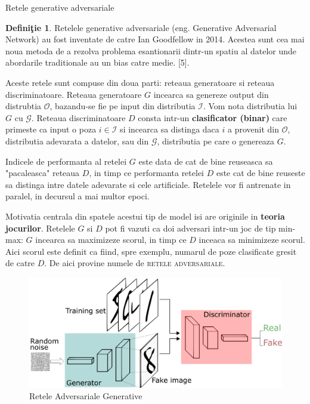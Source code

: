 \documentclass[12pt]{article}
\theoremstyle{definition}
\newtheorem{defi}[thr]{\bf Defini\c{t}ie}
\begin{document}
\begin{subsubsection}{Retele generative adversariale}
\begin{defi}
Retelele generative adversariale (eng. Generative Adversarial Network) au fost inventate de catre Ian Goodfellow in 2014.
Acestea sunt cea mai noua metoda de a rezolva problema esantionarii dintr-un spatiu al datelor unde abordarile traditionale au un bias catre medie. [5].

Aceste retele sunt compuse din doua parti: reteaua generatoare si reteaua discriminatoare.
Reteaua generatoare $G$ incearca sa genereze output din distrubtia $\mathcal{O}$, bazandu-se fie pe input din distributia $\mathcal{I}$. Vom nota distributia lui $G$ cu $\mathcal{G}$.
Reteaua discriminatoare $D$ consta intr-un \textbf{clasificator (binar)} care primeste ca input o poza $i \in \mathcal{I}$ si incearca sa distinga daca $i$ a provenit din $\mathcal{O}$, distributia adevarata a datelor, sau din $\mathcal{G}$, distributia pe care o genereaza $G$.

Indicele de performanta al retelei $G$ este data de cat de bine reuseasca sa "pacaleasca" reteaua $D$, in timp ce performanta retelei $D$ este cat de bine reuseste sa distinga intre datele adevarate si cele artificiale. Retelele vor fi antrenate in paralel, in decursul a mai multor epoci.

\end{defi}
Motivatia centrala din spatele acestui tip de model isi are originile in \textbf{teoria jocurilor}. Retelele $G$ si $D$ pot fi vazuti ca doi adversari intr-un joc de tip min-max: $G$ incearca sa maximizeze scorul, in timp ce $D$ inceaca sa minimizeze scorul. Aici scorul este definit ca fiind, spre exemplu, numarul de poze clasificate gresit de catre $D$. De aici provine numele de \textsc{retele adversariale}.

\begin{figure}
  \centering
  \includegraphics[width=0.7\linewidth]{GAN.png}
  \caption{Retele Adversariale Generative}
  \label{fig:GAN}
\end{figure}

\end{subsubsection}
\end{document}
